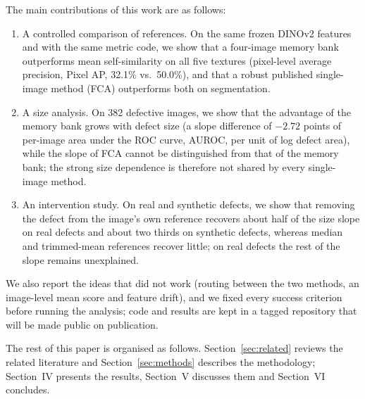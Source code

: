 The main contributions of this work are as follows:
\begin{enumerate}
  \item A controlled comparison of references. On the same frozen DINOv2
  features and with the same metric code, we show that a four-image memory bank
  outperforms mean self-similarity on all five textures (pixel-level average
  precision, Pixel AP, 32.1\% vs.\ 50.0\%), and that a robust published
  single-image method (FCA) outperforms both on segmentation.
  \item A size analysis. On 382 defective images, we show that the advantage of
  the memory bank grows with defect size (a slope difference of $-2.72$ points
  of per-image area under the ROC curve, AUROC, per unit of log defect area),
  while the slope of FCA cannot be distinguished from that of the memory bank;
the strong size dependence is therefore not shared by every single-image
method.
  \item An intervention study. On real and synthetic defects, we show that
  removing the defect from the image's own reference recovers about half of the
  size slope on real defects and about two thirds on synthetic defects, whereas median and trimmed-mean references recover little; on real defects
the rest of the slope remains unexplained.
\end{enumerate}
We also report the ideas that did not work (routing between the two methods, an
image-level mean score and feature drift), and we fixed every success criterion
before running the analysis; code and results are kept in a tagged repository that will be made public
on publication.

The rest of this paper is organised as follows.
Section~\ref{sec:related} reviews the related literature and
Section~\ref{sec:methods} describes the methodology; Section~IV presents the
results, Section~V discusses them and Section~VI concludes.
